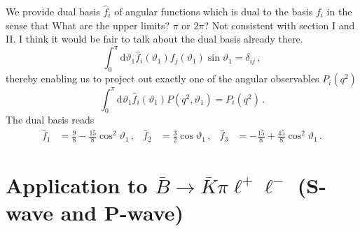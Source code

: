 \documentclass[aps,prd,reprint,nofootinbib,preprintnumbers]{revtex4}
\newcommand{\dd}{\text{d}}
\renewcommand{\theta}{\vartheta}
\newcommand{\fred}[1]{{\color{brown!85!black}#1}}
\begin{document}
We provide dual basis $\hat{f}_i$ of angular functions which is dual to the basis $f_i$ in the sense that \fred{What are the upper limits? $\pi$ or $2 \pi$? Not consistent with section I and II. I think it would be fair to talk about the dual basis already there.}
\begin{equation}
    \int_0^\pi \dd\theta_1 \hat{f}_i(\theta_1) f_j(\theta_1) \sin\theta_1 = \delta_{ij}\,,
\end{equation}
thereby enabling us to project out exactly one of the angular
observables $P_i(q^2)$
\begin{equation}
    \int_0^\pi \dd \theta_1\hat{f}_i(\theta_1) P(q^2, \theta_1) = P_i(q^2)\,.
\end{equation}
The dual basis reads
\begin{equation}
\begin{aligned}
    \hat{f}_1 & = \frac{9}{8} - \frac{15}{8}\cos^2\theta_1\,, &
    \hat{f}_2 & = \frac{3}{2}\cos\theta_1\,, &
    \hat{f}_3 & = -\frac{15}{8} + \frac{45}{8}\cos^2\theta_1\,.
\end{aligned}
\end{equation}

\section{Application to $\bar{B}\to\bar{K}\pi\ell^+\ell^-$ (S-wave and P-wave)}
\label{app:btokstarll}
\end{document}
